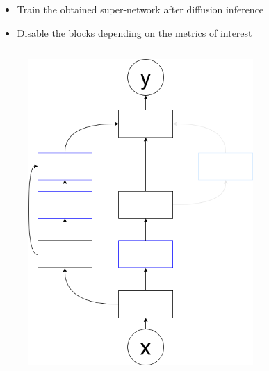 \documentclass[aspectratio=169,xcolor=dvipsnames]{beamer}
\begin{document}
\begin{frame}
    \begin{itemize}
        \item Train the obtained super-network after diffusion inference
        \item Disable the blocks depending on the metrics of interest
    \end{itemize}
    \begin{columns}[c]
        \begin{figure}[htbp]
            \centering
            \includegraphics[width=.8\textwidth]{diagram_disabled1.drawio.png}
        \end{figure}
        \begin{figure}[htbp]
            \centering

\end{figure}
\end{columns}
\end{frame}
\end{document}
